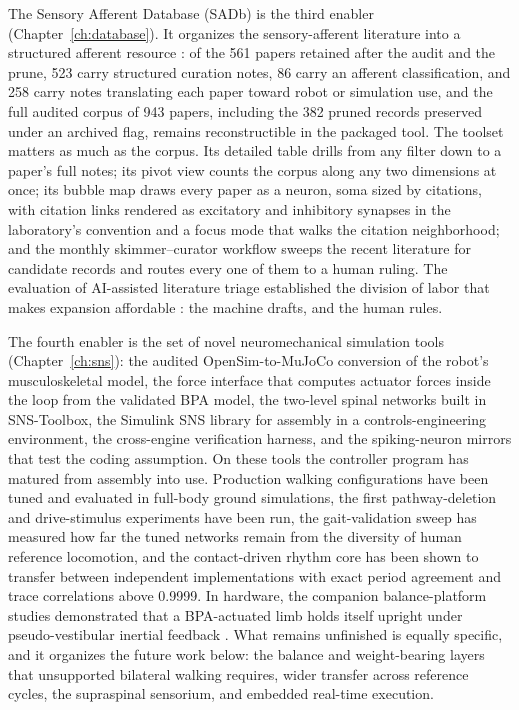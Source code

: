 The Sensory Afferent Database (SADb) is the third enabler (Chapter~\ref{ch:database}). It organizes the sensory-afferent literature into a structured afferent resource \citep{bolen_sensory_2023}: of the 561 papers retained after the audit and the prune, 523 carry structured curation notes, 86 carry an afferent classification, and 258 carry notes translating each paper toward robot or simulation use, and the full audited corpus of 943 papers, including the 382 pruned records preserved under an archived flag, remains reconstructible in the packaged tool. The toolset matters as much as the corpus. Its detailed table drills from any filter down to a paper's full notes; its pivot view counts the corpus along any two dimensions at once; its bubble map draws every paper as a neuron, soma sized by citations, with citation links rendered as excitatory and inhibitory synapses in the laboratory's convention and a focus mode that walks the citation neighborhood; and the monthly skimmer--curator workflow sweeps the recent literature for candidate records and routes every one of them to a human ruling. The evaluation of AI-assisted literature triage established the division of labor that makes expansion affordable \citep{bolen_using_2024}: the machine drafts, and the human rules.

The fourth enabler is the set of novel neuromechanical simulation tools (Chapter~\ref{ch:sns}): the audited OpenSim-to-MuJoCo conversion of the robot's musculoskeletal model, the force interface that computes actuator forces inside the loop from the validated BPA model, the two-level spinal networks built in SNS-Toolbox, the Simulink SNS library for assembly in a controls-engineering environment, the cross-engine verification harness, and the spiking-neuron mirrors that test the coding assumption. On these tools the controller program has matured from assembly into use. Production walking configurations have been tuned and evaluated in full-body ground simulations, the first pathway-deletion and drive-stimulus experiments have been run, the gait-validation sweep has measured how far the tuned networks remain from the diversity of human reference locomotion, and the contact-driven rhythm core has been shown to transfer between independent implementations with exact period agreement and trace correlations above 0.9999. In hardware, the companion balance-platform studies demonstrated that a BPA-actuated limb holds itself upright under pseudo-vestibular inertial feedback \citep{bolen_balance_2024, bolen_selfbalancing_2024, bolen_selfbalancing_srs_2024}. What remains unfinished is equally specific, and it organizes the future work below: the balance and weight-bearing layers that unsupported bilateral walking requires, wider transfer across reference cycles, the supraspinal sensorium, and embedded real-time execution.

